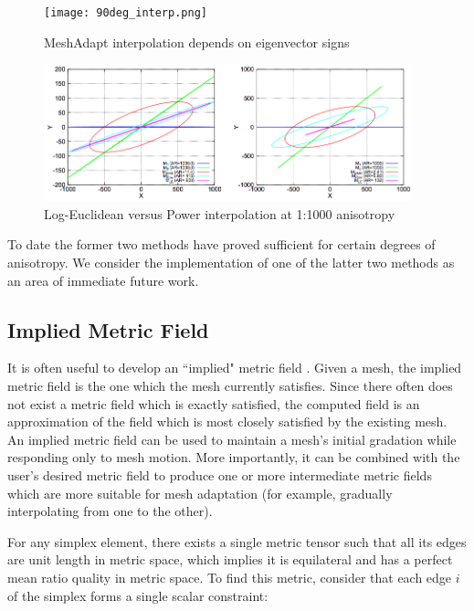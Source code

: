 \begin{figure}
\begin{center}
\texttt{[image: 90deg\_interp.png]}
\caption{MeshAdapt interpolation depends on eigenvector signs}
\label{fig:90deg_interp}
\end{center}
\end{figure}

\begin{figure}
\begin{center}
\includegraphics[width=0.95\textwidth]{log_interp.png}
\caption{Log-Euclidean versus Power interpolation
at 1:1000 anisotropy \cite{michal2012anisotropic}}
\label{fig:log_interp}
\end{center}
\end{figure}

To date the former two methods have proved sufficient for certain
degrees of anisotropy.
We consider the implementation of one
of the latter two methods as an area of immediate future work.

\subsection{Implied Metric Field}
\label{sec:ident_metric}

It is often useful to develop an ``implied" metric field
\cite{michal2012anisotropic}.
Given a mesh, the implied metric field is the one which the mesh
currently satisfies.
Since there often does not exist a metric field which is exactly
satisfied, the computed field is an approximation of the field
which is most closely satisfied by the existing mesh.
An implied metric field can be used to maintain a mesh's
initial gradation while responding only to mesh motion.
More importantly, it can be combined with the user's desired
metric field to produce one or more intermediate metric fields
which are more suitable for mesh adaptation
(for example, gradually interpolating from one to the other).

For any simplex element, there exists a single metric tensor
such that all its edges are unit length in metric space, which
implies it is equilateral and has a perfect mean ratio quality
in metric space.
To find this metric, consider that each edge $i$ of the simplex
forms a single scalar constraint:


